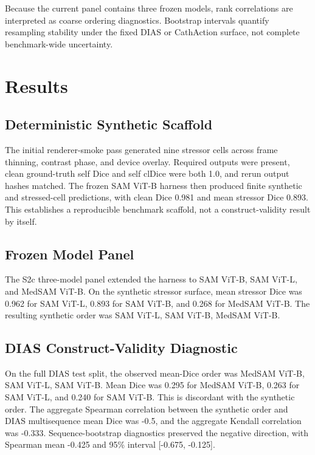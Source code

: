 \documentclass[11pt]{article}
\begin{document}
Because the current panel contains three frozen models, rank correlations are interpreted as coarse ordering diagnostics. Bootstrap intervals quantify resampling stability under the fixed DIAS or CathAction surface, not complete benchmark-wide uncertainty.


\section*{Results}

\subsection*{Deterministic Synthetic Scaffold}

The initial renderer-smoke pass generated nine stressor cells across frame thinning, contrast phase, and device overlay. Required outputs were present, clean ground-truth self Dice and self clDice were both 1.0, and rerun output hashes matched. The frozen SAM ViT-B harness then produced finite synthetic and stressed-cell predictions, with clean Dice 0.981 and mean stressor Dice 0.893. This establishes a reproducible benchmark scaffold, not a construct-validity result by itself.


\subsection*{Frozen Model Panel}

The S2c three-model panel extended the harness to SAM ViT-B, SAM ViT-L, and MedSAM ViT-B. On the synthetic stressor surface, mean stressor Dice was 0.962 for SAM ViT-L, 0.893 for SAM ViT-B, and 0.268 for MedSAM ViT-B. The resulting synthetic order was SAM ViT-L, SAM ViT-B, MedSAM ViT-B.


\subsection*{DIAS Construct-Validity Diagnostic}

On the full DIAS test split, the observed mean-Dice order was MedSAM ViT-B, SAM ViT-L, SAM ViT-B. Mean Dice was 0.295 for MedSAM ViT-B, 0.263 for SAM ViT-L, and 0.240 for SAM ViT-B. This is discordant with the synthetic order. The aggregate Spearman correlation between the synthetic order and DIAS multisequence mean Dice was -0.5, and the aggregate Kendall correlation was -0.333. Sequence-bootstrap diagnostics preserved the negative direction, with Spearman mean -0.425 and 95\% interval [-0.675, -0.125].
\end{document}
